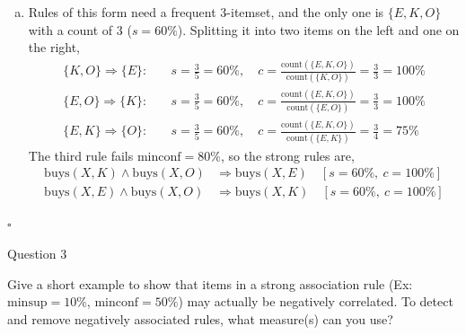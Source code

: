 \documentclass[12pt,letterpaper, onecolumn]{exam}
\newcommand{\minsup}{\mathrm{minsup}}
\newcommand{\minconf}{\mathrm{minconf}}
\begin{document}
\begin{questions}
\begin{solution}
\begin{enumerate}[a.)]
            Apriori is a level-wise generate-and-test method. The candidates $C_k$ are built by joining $L_{k-1}$, so they cannot exist until the pass that found $L_{k-1}$ is done, and the only way to get the support of a candidate is to count it against the transactions. So scan 1 gives $L_1$, scan 2 gives $L_2$, \dots, and scan $k$ gives $L_k$, meaning a frequent $k$-itemset takes $k$ scans to discover. One more scan to count $C_{k+1}$ (and find nothing frequent) is the ``checking whether a $k+1$ itemset is frequent'' step that is excluded. In part a.), $L_3$ only had one itemset, so $C_4$ was empty after the join and that extra scan was not even needed.

            \item Rules of this form need a frequent 3-itemset, and the only one is $\{E,K,O\}$ with a count of 3 ($s=60\%$). Splitting it into two items on the left and one on the right,
            \begin{align*}
                \{K,O\}\Rightarrow\{E\}:&\quad s = \tfrac{3}{5} = 60\%, \quad c = \frac{\text{count}(\{E,K,O\})}{\text{count}(\{K,O\})} = \frac{3}{3} = 100\% \\
                \{E,O\}\Rightarrow\{K\}:&\quad s = \tfrac{3}{5} = 60\%, \quad c = \frac{\text{count}(\{E,K,O\})}{\text{count}(\{E,O\})} = \frac{3}{3} = 100\% \\
                \{E,K\}\Rightarrow\{O\}:&\quad s = \tfrac{3}{5} = 60\%, \quad c = \frac{\text{count}(\{E,K,O\})}{\text{count}(\{E,K\})} = \frac{3}{4} = 75\%
            \end{align*}
            The third rule fails $\minconf = 80\%$, so the strong rules are,
            \begin{align*}
                \text{buys}(X,K)\wedge\text{buys}(X,O) &\Rightarrow \text{buys}(X,E) \quad [s=60\%,\ c=100\%] \\
                \text{buys}(X,E)\wedge\text{buys}(X,O) &\Rightarrow \text{buys}(X,K) \quad [s=60\%,\ c=100\%]
            \end{align*}
        \end{enumerate}

        $\square$
    \end{solution}

    \newpage
    \question Question 3

    Give a short example to show that items in a strong association rule (Ex: $\minsup = 10\%$, $\minconf = 50\%$) may actually be negatively correlated. To detect and remove negatively associated rules, what measure(s) can you use?


\end{questions}
\end{document}
